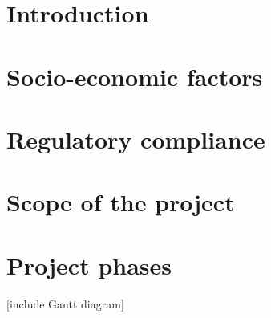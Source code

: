 \section{Introduction}


\section{Socio-economic factors}

\section{Regulatory compliance}

\section{Scope of the project}

\section{Project phases}
[include Gantt diagram]

